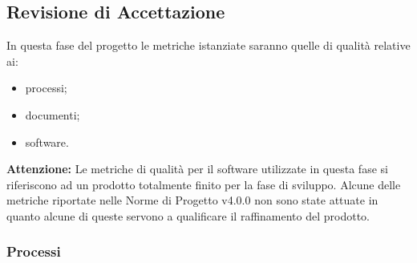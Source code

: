 \clearpage
\subsection{Revisione di Accettazione}
\label{sec:revisione_accettazione}
In questa fase del progetto le metriche istanziate saranno quelle di qualità relative ai:
\begin{itemize}
	\item processi;
	\item documenti;
	\item software.
\end{itemize}
\textbf{Attenzione:} Le metriche di qualità per il software utilizzate in questa fase si riferiscono ad un prodotto totalmente finito per la fase di sviluppo. Alcune delle metriche riportate nelle Norme di Progetto v4.0.0 non sono state attuate in quanto alcune di queste servono a qualificare il raffinamento del prodotto.
\subsubsection{Processi}
